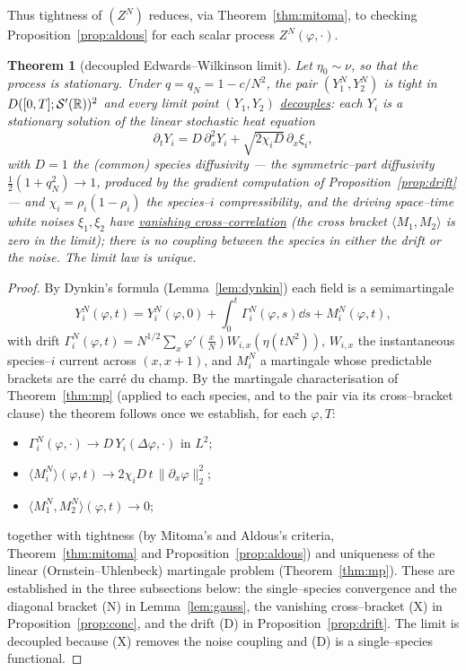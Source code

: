 \documentclass[11pt]{article}
\theoremstyle{plain}
\newtheorem{theorem}{Theorem}[section]
\theoremstyle{definition}
\theoremstyle{remark}
\begin{document}
\noindent Thus tightness of $(Z^N)$ reduces, via Theorem~\ref{thm:mitoma}, to checking
Proposition~\ref{prop:aldous} for each scalar process $Z^N(\varphi,\cdot)$.

\begin{theorem}[decoupled Edwards--Wilkinson limit]\label{thm:ewmain}
Let $\eta_0\sim\nu$, so that the process is stationary. Under $q=q_N=1-c/N^2$, the
pair $(Y_1^N,Y_2^N)$ is tight in
$D([0,T];\mathcal S'(\mathbb{R}))^2$ and every limit point $(Y_1,Y_2)$ \underline{decouples}: each $Y_i$ is
a stationary solution of the linear stochastic heat equation
\[
  \partial_t Y_i=D\,\partial_x^2 Y_i+\sqrt{2\chi_i D}\,\partial_x\xi_i,
\]
with $D=1$ the (common) species diffusivity --- the symmetric--part diffusivity
$\tfrac12(1+q_N^2)\to1$, produced by the gradient computation of
Proposition~\ref{prop:drift} --- and $\chi_i=\rho_i(1-\rho_i)$ the
species--$i$ compressibility,
and the driving space--time white noises $\xi_1,\xi_2$ have \underline{vanishing
cross--correlation} (the cross bracket $\langle M_1,M_2\rangle$ is zero in the limit);
there is no coupling between the species in either the drift or the noise. The limit
law is unique.
\end{theorem}

\begin{proof}
By Dynkin's formula (Lemma~\ref{lem:dynkin}) each field is a semimartingale
\begin{equation}\label{eq:dynkin}
  Y_i^N(\varphi,t)=Y_i^N(\varphi,0)+\int_0^t\Gamma_i^N(\varphi,s)\dd s+M_i^N(\varphi,t),
\end{equation}
with drift $\Gamma_i^N(\varphi,t)=N^{1/2}\sum_x\varphi'(\tfrac xN)W_{i,x}(\eta(tN^2))$,
$W_{i,x}$ the instantaneous species--$i$ current across $(x,x{+}1)$, and $M_i^N$ a
martingale whose predictable brackets are the carr\'e du champ. By the martingale
characterisation of Theorem~\ref{thm:mp} (applied to each species, and to the pair via
its cross--bracket clause) the theorem follows once we establish, for each $\varphi,T$:
\begin{itemize}
\item[\textup{(D)}] $\Gamma_i^N(\varphi,\cdot)\to D\,Y_i(\Delta\varphi,\cdot)$ in $L^2$;
\item[\textup{(N)}] $\langle M_i^N\rangle(\varphi,t)\to 2\chi_i D\,t\,\|\partial_x\varphi\|_2^2$;
\item[\textup{(X)}] $\langle M_1^N,M_2^N\rangle(\varphi,t)\to0$;
\end{itemize}
together with tightness (by Mitoma's and Aldous's criteria,
Theorem~\ref{thm:mitoma} and Proposition~\ref{prop:aldous}) and uniqueness of the linear
(Ornstein--Uhlenbeck) martingale problem (Theorem~\ref{thm:mp}). These
are established in the three subsections below: the single--species convergence and the
diagonal bracket (N) in Lemma~\ref{lem:gauss}, the vanishing cross--bracket (X) in
Proposition~\ref{prop:conc}, and the drift (D) in Proposition~\ref{prop:drift}. The
limit is decoupled because (X) removes the noise coupling and (D) is a single--species
functional.
\end{proof}
\end{document}
